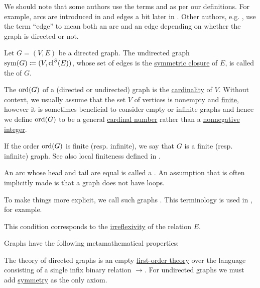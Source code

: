 \begin{definition}
\begin{thmenum}[series=def:graph]
    We should note that some authors use the terms  and  as per our definitions. For example, arcs are introduced in \cite[ch. 1, sec. 1.1]{GondranMinoux1984Graphs} and edges a bit later in \cite[ch. 1, sec. 1.3]{GondranMinoux1984Graphs}. Other authors, e.g. \cite[sec. 5.2]{Erickson2019}, use the term \enquote{edge} to mean both an arc and an edge depending on whether the graph is directed or not.

     Let \( G = (V, E) \) be a directed graph. The undirected graph \( \operatorname{sym}(G) \coloneqq (V, \operatorname{cl}^S(E)) \), whose set of edges is the \hyperref[def:derived_relations/symmetric]{symmetric closure} of \( E \), is called the  of \( G \).

     The  \( \operatorname{ord}(G) \) of a (directed or undirected) graph is the \hyperref[thm:cardinality_existence]{cardinality} of \( V \). Without context, we usually assume that the set \( V \) of vertices is nonempty and \hyperref[def:set_finiteness]{finite}, however it is sometimes beneficial to consider empty or infinite graphs and hence we define \( \operatorname{ord}(G) \) to be a general \hyperref[def:cardinal]{cardinal number} rather than a \hyperref[rem:peano_arithmetic_zero/nonnegative]{nonnegative integer}.

    If the order \( \operatorname{ord}(G) \) is finite (resp. infinite), we say that \( G \) is a finite (resp. infinite) graph. See also local finiteness defined in .

     An arc whose head and tail are equal is called a . An assumption that is often implicitly made is that a graph does not have loops.

    To make things more explicit, we call such graphs . This terminology is used in , for example.

    This condition corresponds to the \hyperref[def:binary_relation/irreflexive]{irreflexivity} of the relation \( E \).
  \end{thmenum}

  Graphs have the following metamathematical properties:
  \begin{thmenum}[resume=def:graph]
     The theory of directed graphs is an empty \hyperref[def:first_order_theory]{first-order theory} over the language consisting of a single infix binary relation \( \to \). For undirected graphs we must add \hyperref[def:binary_relation/symmetric]{symmetry} as the only axiom.


\end{thmenum}
\end{definition}
